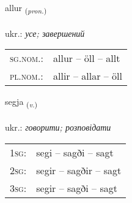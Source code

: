 \documentclass[frontgrid, backgrid]{flacards}\usepackage[]{graphicx}\usepackage[]{xcolor}
\begin{document}
\renewcommand{\flhead}{\vskip5pt \fboxsep=0pt {\small\bfseries\footnotesize Fornafn | займенник}}
\renewcommand{\fcfoot}{\vskip5pt \fboxsep=0pt \hspace{2pt}{\small\bfseries\footnotesize 1K}}

\renewcommand{\blhead}{\vskip5pt {\small\bfseries\footnotesize Fornafn | займенник }}
\renewcommand{\bcfoot}{\vskip5pt \hspace{2pt}{\small\bfseries\footnotesize 1K}}


{allur \small{\textsubscript{(\textit{pron.})}} \\[1ex] %
\textphonetic{[atlʏr]} \\
ukr.: \emph{усе; завершений} \\  [2ex]
\renewcommand*{\arraystretch}{0.8}
\begin{tabular}{ll}
\textsc{sg.nom.}: & allur  --  öll -- allt \\ 
\textsc{pl.nom.}: & allir -- allar -- öll
\end{tabular}
}

\renewcommand{\flhead}{\vskip5pt \fboxsep=0pt {\small\bfseries\footnotesize Sagnorð | дієслово}}
\renewcommand{\fcfoot}{\vskip5pt \fboxsep=0pt \hspace{2pt}{\small\bfseries\footnotesize 1K}}

\renewcommand{\blhead}{\vskip5pt {\small\bfseries\footnotesize Sagnorð | дієслово }}
\renewcommand{\bcfoot}{\vskip5pt \hspace{2pt}{\small\bfseries\footnotesize 1K}}


{segja \small{\textsubscript{(\textit{v.})}} \\[1ex] %
\textphonetic{[seija]} \\
ukr.: \emph{говорити; розповідати} \\  [2ex]
\renewcommand*{\arraystretch}{0.8}
\begin{tabular}{p{1cm}l}
\textsc{1sg}: & segi -- sagði -- sagt \\ 
\textsc{2sg}: & segir -- sagðir -- sagt \\ 
\textsc{3sg}: & segir -- sagði -- sagt \\ 
\end{tabular}
}
\end{document}
